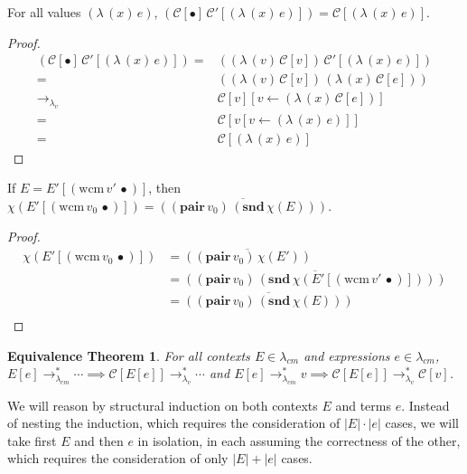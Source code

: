 \documentclass[ms,electronic,twosidetoc,letterpaper,chaptercenter,parttop]{byumsphd}
\newcommand{\pair}[2]{((\mathbf{pair}\,#1)\,#2)}
\newcommand{\eval}[1]{\overline{#1}}
\newcommand{\lvrr}{\rightarrow_{\lambda_v}}
\newcommand{\lvrrs}{\rightarrow_{\lambda_v}^{*}}
\newcommand{\cmrrs}{\rightarrow_{\lambda_{cm}}^{*}}
\newcommand{\C}[1]{\mathcal{C}[#1]}
\newcommand{\Cp}[1]{\mathcal{C}'[#1]}
\newcommand{\abs}[2]{(\lambda\,(#1)\,#2)}
\newcommand{\app}[2]{(#1\,#2)}
\newcommand{\wcm}[2]{(\mathrm{wcm}\,#1\,#2)}
\newcommand{\hole}{\bullet}
\begin{document}
\begin{lemma}
\label{hole-context-to-value}
For all values $\abs{x}{e}$, $\app{\C{\hole}}{\Cp{\abs{x}{e}}}=\C{\abs{x}{e}}$.
\end{lemma}

\begin{proof}
\begin{align*}
\app{\C{\hole}}{\Cp{\abs{x}{e}}} = &\app{\abs{v}{\C{v}}}{\Cp{\abs{x}{e}}}\\
                                 = &\app{\abs{v}{\C{v}}}{\abs{x}{\C{e}}}\\
                             \lvrr &\C{v}[v\leftarrow \abs{x}{\C{e}}]\\
                                 = &\C{v[v\leftarrow \abs{x}{e}]}\\
                                 = &\C{\abs{x}{e}}
\end{align*}
\end{proof}

\begin{lemma}
\label{wcm-collapse}
If $E=E'[\wcm{v'}{\hole}]$, then $\chi(E'[\wcm{v_0}{\hole}])=\eval{\pair{v_0}{\app{\mathbf{snd}}{\chi(E)}}}$.
\end{lemma}

\begin{proof}
\begin{align*}
\chi(E'[\wcm{v_0}{\hole}]) &= \eval{\pair{v_0}{\chi(E')}}\\
                           &= \eval{\pair{v_0}{\app{\mathbf{snd}}{\chi(E'[\wcm{v'}{\hole}])}}}\\
                           &= \eval{\pair{v_0}{\app{\mathbf{snd}}{\chi(E)}}}\\
\end{align*}
\end{proof}

\newtheorem*{eqtheorem}{Equivalence Theorem}
\begin{eqtheorem}
For all contexts $E\in\lambda_{cm}$ and expressions $e\in\lambda_{cm}$, $E[e]\cmrrs\cdots\implies\C{E[e]}\lvrrs\cdots$ and $E[e]\cmrrs v\implies\C{E[e]}\lvrrs \C{v}$.
\end{eqtheorem}

We will reason by structural induction on both contexts $E$ and terms $e$. Instead of
nesting the induction, which requires the consideration of $|E|\cdot|e|$ cases, we will
take first $E$ and then $e$ in isolation, in each assuming the correctness of the other,
which requires the consideration of only $|E|+|e|$ cases.
\end{document}
